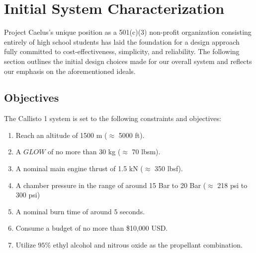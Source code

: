 \documentclass[9pt]{article} %
\numberwithin{equation}{section} %
\begin{document}
\section{Initial System Characterization}
\hspace{\parindent}  Project Caelus's unique position as a 501(c)(3) non-profit organization consisting entirely of high school students has laid the foundation for a design approach fully committed to cost-effectiveness, simplicity, and reliability. The following section outlines the initial design choices made for our overall system and reflects our emphasis on the aforementioned ideals.
\subsection{Objectives}
The Callisto 1 system is set to the following constraints and objectives:
\begin{enumerate}
\item Reach an altitude of 1500 m ($\approx$ 5000 ft).
\item A $GLOW$ of no more than 30 kg ($\approx$ 70 lbsm).
\item A nominal main engine thrust of 1.5 kN ($\approx$ 350 lbsf).
\item A chamber pressure in the range of around 15 Bar to 20 Bar ($\approx$ 218 psi to 300 psi)
\item A nominal burn time of around 5 seconds.
\item Consume a budget of no more than \$10,000 USD.
\item Utilize $95\%$ ethyl alcohol and nitrous oxide as the propellant combination.
\end{enumerate}
\end{document}
